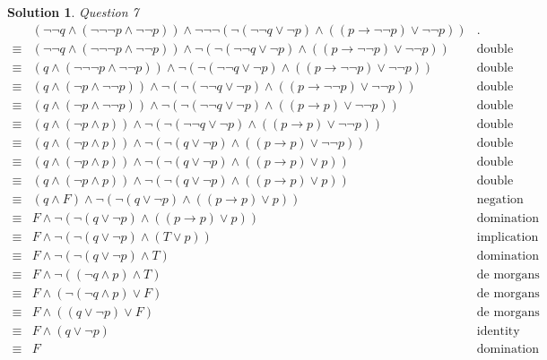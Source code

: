 \documentclass{article}
\theoremstyle{definition}
\newtheorem*{solution}{Solution}
\begin{document}
\begin{solution}
 \textit{Question 7}
 \begin{align*}
 & (\neg \neg q \wedge (\neg \neg \neg p \wedge \neg \neg p)) \wedge \neg \neg \neg (\neg (\neg \neg q \vee \neg p) \wedge ((p \to \neg \neg p) \vee \neg \neg p)) & \text{.}\ \\
 \equiv & (\neg \neg q \wedge (\neg \neg \neg p \wedge \neg \neg p)) \wedge \neg (\neg (\neg \neg q \vee \neg p) \wedge ((p \to \neg \neg p) \vee \neg \neg p)) & \text{double negation}\ \\
 \equiv & ( q \wedge (\neg \neg \neg p \wedge \neg \neg p)) \wedge \neg (\neg (\neg \neg q \vee \neg p) \wedge ((p \to \neg \neg p) \vee \neg \neg p)) & \text{double negation}\ \\
 \equiv & ( q \wedge ( \neg p \wedge \neg \neg p)) \wedge \neg (\neg (\neg \neg q \vee \neg p) \wedge ((p \to \neg \neg p) \vee \neg \neg p)) & \text{double negation}\ \\
 \equiv & ( q \wedge ( \neg p \wedge \neg \neg p)) \wedge \neg (\neg (\neg \neg q \vee \neg p) \wedge ((p \to  p) \vee \neg \neg p)) & \text{double negation}\ \\
 \equiv & ( q \wedge ( \neg p \wedge  p)) \wedge \neg (\neg (\neg \neg q \vee \neg p) \wedge ((p \to  p) \vee \neg \neg p)) & \text{double negation}\ \\
 \equiv & ( q \wedge ( \neg p \wedge  p)) \wedge \neg (\neg ( q \vee \neg p) \wedge ((p \to  p) \vee \neg \neg p)) & \text{double negation}\ \\
 \equiv & ( q \wedge ( \neg p \wedge  p)) \wedge \neg (\neg ( q \vee \neg p) \wedge ((p \to  p) \vee p)) & \text{double negation}\ \\
 \equiv & ( q \wedge ( \neg p \wedge  p)) \wedge \neg (\neg ( q \vee \neg p) \wedge ((p \to  p) \vee p)) & \text{double negation}\ \\
 \equiv & ( q \wedge F) \wedge \neg (\neg ( q \vee \neg p) \wedge ((p \to  p) \vee p)) & \text{negation}\ \\
 \equiv & F \wedge \neg (\neg ( q \vee \neg p) \wedge ((p \to  p) \vee p)) & \text{domination}\ \\
 \equiv & F \wedge \neg (\neg ( q \vee \neg p) \wedge (T \vee p)) & \text{implication}\ \\
 \equiv & F \wedge \neg (\neg ( q \vee \neg p) \wedge T) & \text{domination}\ \\
 \equiv & F \wedge \neg (( \neg q \wedge p) \wedge T) & \text{de morgans}\ \\
 \equiv & F \wedge (\neg( \neg q \wedge p) \vee F) & \text{de morgans}\ \\
 \equiv & F \wedge (( q \vee \neg p) \vee F) & \text{de morgans}\ \\
 \equiv & F \wedge ( q \vee \neg p) & \text{identity}\ \\
 \equiv & F & \text{domination}\ \\
 \end{align*}
 \end{solution}
\end{document}
